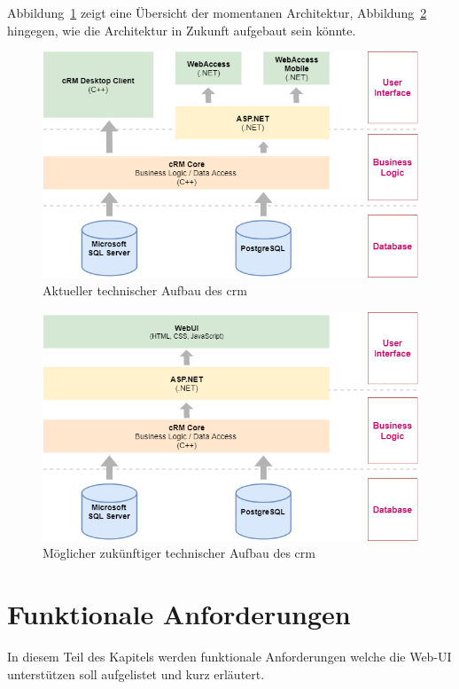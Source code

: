 Abbildung~\ref{fig:crm_technical_stack} zeigt eine Übersicht der momentanen Architektur, Abbildung~\ref{fig:crm_future_technical_stack} hingegen, wie die Architektur in Zukunft aufgebaut sein könnte.

\begin{figure}
    \centering
    \captionsetup{justification=centering}
    \includegraphics[width=\textwidth]{figures/crm_technical_stack.png}
        \caption{Aktueller technischer Aufbau des \gls{crm}}\label{fig:crm_technical_stack}
\end{figure}

\begin{figure}
    \centering
    \captionsetup{justification=centering}
    \includegraphics[width=\textwidth]{figures/crm_future_technical_stack.png}
        \caption{Möglicher zukünftiger technischer Aufbau des \gls{crm}}\label{fig:crm_future_technical_stack}
\end{figure}


\section{Funktionale Anforderungen}
In diesem Teil des Kapitels werden funktionale Anforderungen welche die Web-UI unterstützen soll aufgelistet und kurz erläutert.

